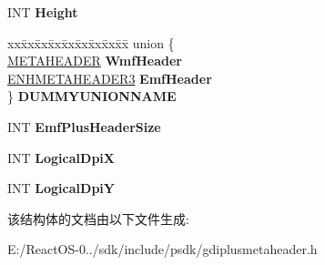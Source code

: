 \begin{DoxyCompactItemize}
I\+NT {\bfseries Height}
\item 
\mbox{\label{struct_metafile_header_a0e9498311962e37a619bb6d1dc060e06}} 
\begin{tabbing}
xx\=xx\=xx\=xx\=xx\=xx\=xx\=xx\=xx\=\kill
union \{\\
\>\hyperlink{structtag_m_e_t_a_h_e_a_d_e_r}{METAHEADER} {\bfseries WmfHeader}\\
\>\hyperlink{struct_e_n_h_m_e_t_a_h_e_a_d_e_r3}{ENHMETAHEADER3} {\bfseries EmfHeader}\\
\} {\bfseries DUMMYUNIONNAME}\\

\end{tabbing}\item 
\mbox{\label{struct_metafile_header_acf928f40cde3880be861c3cd12b4bc52}} 
I\+NT {\bfseries Emf\+Plus\+Header\+Size}
\item 
\mbox{\label{struct_metafile_header_a2acfd423e7a4839e63ec44385b4475a2}} 
I\+NT {\bfseries Logical\+DpiX}
\item 
\mbox{\label{struct_metafile_header_ac81fc83150886cfddc1f792809b7d4ec}} 
I\+NT {\bfseries Logical\+DpiY}
\end{DoxyCompactItemize}


该结构体的文档由以下文件生成\+:\begin{DoxyCompactItemize}
\item 
E\+:/\+React\+O\+S-\/0../sdk/include/psdk/gdiplusmetaheader.\+h\end{DoxyCompactItemize}
